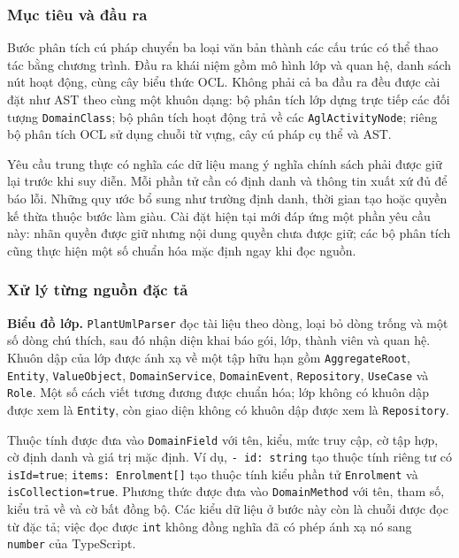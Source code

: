\subsubsection{Mục tiêu và đầu ra}

Bước phân tích cú pháp chuyển ba loại văn bản thành các cấu trúc có thể thao tác bằng chương trình. Đầu ra khái niệm gồm mô hình lớp và quan hệ, danh sách nút hoạt động, cùng cây biểu thức OCL. Không phải cả ba đầu ra đều được cài đặt như AST theo cùng một khuôn dạng: bộ phân tích lớp dựng trực tiếp các đối tượng \texttt{DomainClass}; bộ phân tích hoạt động trả về các \texttt{AglActivityNode}; riêng bộ phân tích OCL sử dụng chuỗi từ vựng, cây cú pháp cụ thể và AST.

Yêu cầu trung thực có nghĩa các dữ liệu mang ý nghĩa chính sách phải được giữ lại trước khi suy diễn. Mỗi phần tử cần có định danh và thông tin xuất xứ đủ để báo lỗi. Những quy ước bổ sung như trường định danh, thời gian tạo hoặc quyền kế thừa thuộc bước làm giàu. Cài đặt hiện tại mới đáp ứng một phần yêu cầu này: nhãn quyền được giữ nhưng nội dung quyền chưa được giữ; các bộ phân tích cũng thực hiện một số chuẩn hóa mặc định ngay khi đọc nguồn.

\subsubsection{Xử lý từng nguồn đặc tả}

\textbf{Biểu đồ lớp.} \texttt{PlantUmlParser} đọc tài liệu theo dòng, loại bỏ dòng trống và một số dòng chú thích, sau đó nhận diện khai báo gói, lớp, thành viên và quan hệ. Khuôn dập của lớp được ánh xạ về một tập hữu hạn gồm \texttt{AggregateRoot}, \texttt{Entity}, \texttt{ValueObject}, \texttt{DomainService}, \texttt{DomainEvent}, \texttt{Repository}, \texttt{UseCase} và \texttt{Role}. Một số cách viết tương đương được chuẩn hóa; lớp không có khuôn dập được xem là \texttt{Entity}, còn giao diện không có khuôn dập được xem là \texttt{Repository}.

Thuộc tính được đưa vào \texttt{DomainField} với tên, kiểu, mức truy cập, cờ tập hợp, cờ định danh và giá trị mặc định. Ví dụ, \texttt{- id: string} tạo thuộc tính riêng tư có \texttt{isId=true}; \texttt{items: Enrolment[]} tạo thuộc tính kiểu phần tử \texttt{Enrolment} và \texttt{isCollection=true}. Phương thức được đưa vào \texttt{DomainMethod} với tên, tham số, kiểu trả về và cờ bất đồng bộ. Các kiểu dữ liệu ở bước này còn là chuỗi được đọc từ đặc tả; việc đọc được \texttt{int} không đồng nghĩa đã có phép ánh xạ nó sang \texttt{number} của TypeScript.

